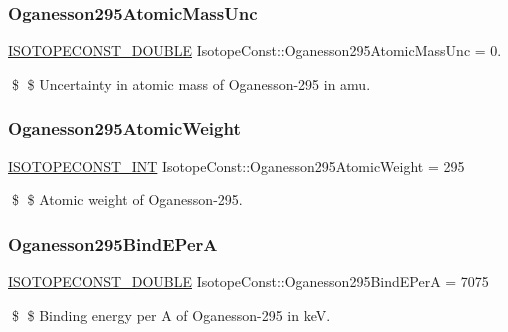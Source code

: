 \subsubsection{\texorpdfstring{Oganesson295\+Atomic\+Mass\+Unc}{Oganesson295AtomicMassUnc}}
{\footnotesize\ttfamily \mbox{\hyperlink{group___isotope_const-_macros_ga8f45a7272ce02c0b4c65c44636ed719a}{I\+S\+O\+T\+O\+P\+E\+C\+O\+N\+S\+T\+\_\+\+D\+O\+U\+B\+LE}} Isotope\+Const\+::\+Oganesson295\+Atomic\+Mass\+Unc = 0.}

\$ \$ Uncertainty in atomic mass of Oganesson-\/295 in amu. \mbox{\label{group___isotope_const-_oganesson-_og295_gaff640e2ac6908b93c6027270a3dd06ed}} 
\subsubsection{\texorpdfstring{Oganesson295\+Atomic\+Weight}{Oganesson295AtomicWeight}}
{\footnotesize\ttfamily \mbox{\hyperlink{group___isotope_const-_macros_ga5f18360b3e99483a35c32d789e62621c}{I\+S\+O\+T\+O\+P\+E\+C\+O\+N\+S\+T\+\_\+\+I\+NT}} Isotope\+Const\+::\+Oganesson295\+Atomic\+Weight = 295}

\$ \$ Atomic weight of Oganesson-\/295. \mbox{\label{group___isotope_const-_oganesson-_og295_gab8db62c2e566cfba6dc61cc47d217690}} 
\subsubsection{\texorpdfstring{Oganesson295\+Bind\+E\+PerA}{Oganesson295BindEPerA}}
{\footnotesize\ttfamily \mbox{\hyperlink{group___isotope_const-_macros_ga8f45a7272ce02c0b4c65c44636ed719a}{I\+S\+O\+T\+O\+P\+E\+C\+O\+N\+S\+T\+\_\+\+D\+O\+U\+B\+LE}} Isotope\+Const\+::\+Oganesson295\+Bind\+E\+PerA = 7075}

\$ \$ Binding energy per A of Oganesson-\/295 in keV. \mbox{\label{group___isotope_const-_oganesson-_og295_ga00faa0ed27f1e090f764cd8404b027d3}} 
